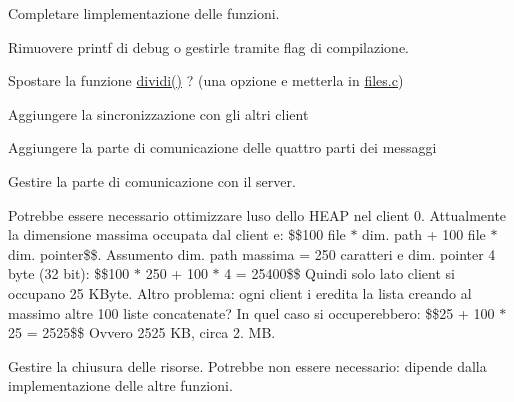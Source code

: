 
\begin{DoxyRefList}
\item[\label{todo__todo000001}%
\Hypertarget{todo__todo000001}%
File \hyperlink{client_8c}{client.c} ]Completare l\textquotesingle{}implementazione delle funzioni. 

Rimuovere printf di debug o gestirle tramite flag di compilazione. 

Spostare la funzione \hyperlink{client_8c_a55586f2b7e9b3620294cf78cda8abdad}{dividi()} ? (una opzione e\textquotesingle{} metterla in \hyperlink{files_8c}{files.\+c}) 
\item[\label{todo__todo000005}%
\Hypertarget{todo__todo000005}%
Globale \hyperlink{client_8h_a54b47b58f228d7bc9827d2919687e25a}{operazioni\+\_\+figlio} (char $\ast$file\+Path)]Aggiungere la sincronizzazione con gli altri client

Aggiungere la parte di comunicazione delle quattro parti dei messaggi 
\item[\label{todo__todo000002}%
\Hypertarget{todo__todo000002}%
Globale \hyperlink{client_8h_a48d605ff689f470746c858648f0a98c2}{S\+I\+G\+I\+N\+T\+Signal\+Handler} (int sig)]Gestire la parte di comunicazione con il server.

Potrebbe essere necessario ottimizzare l\textquotesingle{}uso dello H\+E\+AP nel client 0. Attualmente la dimensione massima occupata dal client e\textquotesingle{}\+: \$\$100 file $\ast$ dim. path + 100 file $\ast$ dim. pointer\$\$. Assumento dim. path massima = 250 caratteri e dim. pointer 4 byte (32 bit)\+: \$\$100 $\ast$ 250 + 100 $\ast$ 4 = 25400\$\$ Quindi solo lato client si occupano 25 K\+Byte. Altro problema\+: ogni client i eredita la lista creando al massimo altre 100 liste concatenate? In quel caso si occuperebbero\+: \$\$25 + 100 $\ast$ 25 = 2525\$\$ Ovvero 2525 KB, circa 2. MB. 
\item[\label{todo__todo000004}%
\Hypertarget{todo__todo000004}%
Globale \hyperlink{client_8h_a50b22adcb76198fcd9402a97ff4711bf}{S\+I\+G\+U\+S\+R1\+Signal\+Handler} (int sig)]Gestire la chiusura delle risorse. Potrebbe non essere necessario\+: dipende dalla implementazione delle altre funzioni.
\end{DoxyRefList}